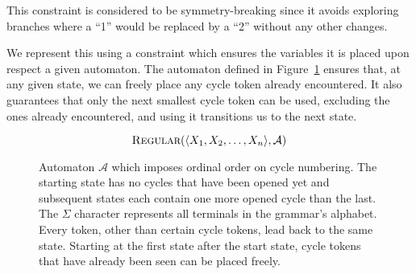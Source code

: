\documentclass[../Document.tex]{subfiles}
\begin{document}
This constraint is considered to be symmetry-breaking since it avoids exploring branches where a ``1'' would be replaced by a ``2'' without any other changes.

We represent this using a \regular constraint which ensures the variables it is placed upon respect a given automaton. The automaton defined in Figure~\ref{fig:cycleCountingAutomaton} ensures that, at any given state, we can freely place any cycle token already encountered. It also guarantees that only the next smallest cycle token can be used, excluding the ones already encountered, and using it transitions us to the next state.

$$\mbox{\sc Regular}(\langle X_1, X_2, \ldots, X_n \rangle, \mathcal{A})$$

\begin{figure}[ht]
    \centering
    \caption[Automaton $\mathcal{A}$ which imposes ordinal order on cycle numbering.]{Automaton $\mathcal{A}$ which imposes ordinal order on cycle numbering. The starting state has no cycles that have been opened yet and subsequent states each contain one more opened cycle than the last. The $\Sigma$ character represents all terminals in the grammar's alphabet. Every token, other than certain cycle tokens, lead back to the same state. Starting at the first state after the start state, cycle tokens that have already been seen can be placed freely.}
    \label{fig:cycleCountingAutomaton}
\end{figure}
\end{document}
